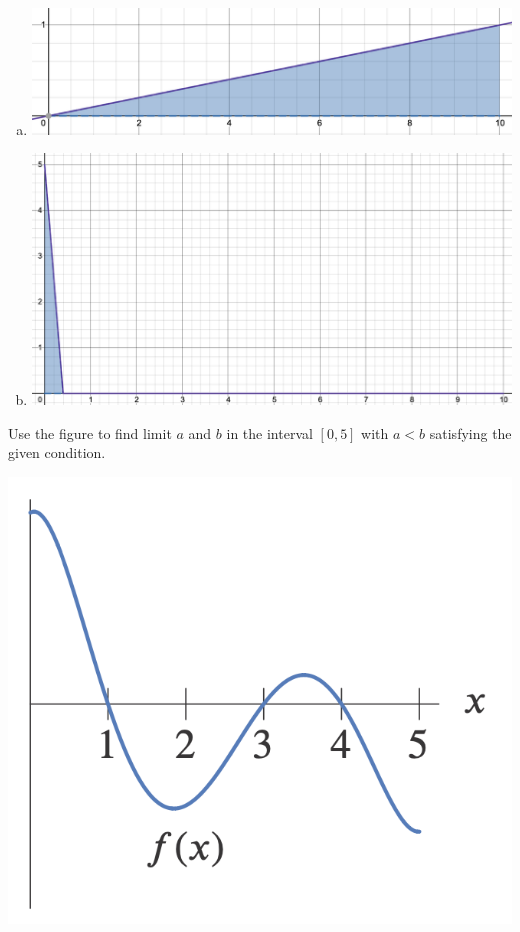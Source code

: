 \documentclass[11pt]{exam}
\begin{document}
\begin{questions}
  \begin{solution}
    \begin{enumerate}[(a)]
    \item \includegraphics[scale=0.5]{Figures/s13a}
    \item \includegraphics[scale=0.5]{Figures/s13b}
    \end{enumerate}
  \end{solution}
\question Use the figure to find limit \(a\) and \(b\) in the interval
  \([0,5]\) with \(a<b\) satisfying the given condition.
  \begin{multicols}{2}
    \includegraphics[scale=0.5]{Figures/graph14}
    \begin{parts}

\end{parts}
\end{multicols}
\end{questions}
\end{document}
